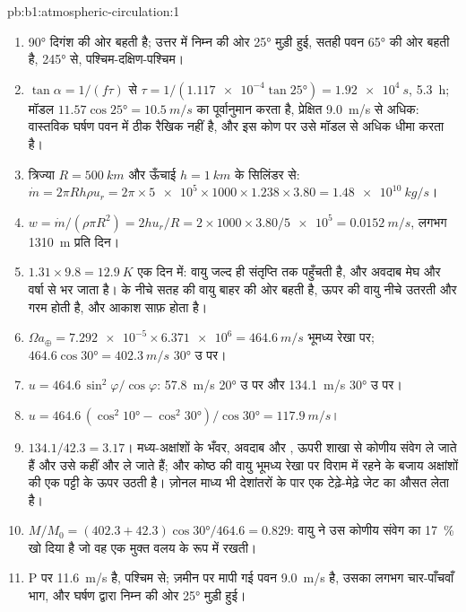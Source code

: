 \begin{solution}{pb:b1:atmospheric-circulation:1}
\begin{enumerate}
  \item {} \ang{90} दिगंश की ओर बहती है; उत्तर में निम्न की ओर \ang{25} मुड़ी हुई, सतही पवन \ang{65} की ओर बहती है, \ang{245} से, पश्चिम-दक्षिण-पश्चिम।
  \item $\tan\alpha = 1/(f\tau)$ से $\tau = 1/(\num{1.117e-4}\tan\ang{25}) =
        \qty{1.92e4}{s}$, \qty{5.3}{h}; मॉडल $11.57\cos\ang{25} =
        \qty{10.5}{m/s}$ का पूर्वानुमान करता है, प्रेक्षित \qty{9.0}{m/s} से अधिक: वास्तविक घर्षण पवन में ठीक रैखिक नहीं है, और इस कोण पर उसे मॉडल से अधिक धीमा करता है।
  \item त्रिज्या $R = \qty{500}{km}$ और ऊँचाई $h =
        \qty{1}{km}$ के सिलिंडर से: $\dot m = 2\pi R h\rho u_r = 2\pi \times \num{5e5} \times 1000
        \times 1.238 \times 3.80 = \qty{1.48e10}{kg/s}$।
  \item $w = \dot m/(\rho\pi R^2) = 2hu_r/R = 2 \times 1000 \times 3.80/\num{5e5} =
        \qty{0.0152}{m/s}$, लगभग \qty{1310}{m} प्रति दिन।
  \item $1.31 \times 9.8 = \qty{12.9}{K}$ एक दिन में: वायु जल्द ही संतृप्ति तक पहुँचती है, और अवदाब मेघ और वर्षा से भर जाता है।  के नीचे सतह की वायु बाहर की ओर बहती है, ऊपर की वायु नीचे उतरती और गरम होती है, और आकाश साफ़ होता है।
  \item $\Omega a_\oplus = \num{7.292e-5} \times \num{6.371e6} = \qty{464.6}{m/s}$
        भूमध्य रेखा पर; $464.6\cos\ang{30} = \qty{402.3}{m/s}$ \ang{30} उ पर।
  \item $u = 464.6\,\sin^2\varphi/\cos\varphi$: \qty{57.8}{m/s} \ang{20} उ पर और
        \qty{134.1}{m/s} \ang{30} उ पर।
  \item $u = 464.6\,(\cos^2\ang{10} - \cos^2\ang{30})/\cos\ang{30} =
        \qty{117.9}{m/s}$।
  \item $134.1/42.3 = 3.17$। मध्य-अक्षांशों के भँवर, अवदाब और , ऊपरी शाखा से कोणीय संवेग ले जाते हैं और उसे कहीं और ले जाते हैं; और कोष्ठ की वायु भूमध्य रेखा पर विराम में रहने के बजाय अक्षांशों की एक पट्टी के ऊपर उठती है। ज़ोनल माध्य भी देशांतरों के पार एक टेढ़े-मेढ़े जेट का औसत लेता है।
  \item $M/M_0 = (402.3 + 42.3)\cos\ang{30}/464.6 = 0.829$: वायु ने उस कोणीय संवेग का \qty{17}{\percent} खो दिया है जो वह एक मुक्त वलय के रूप में रखती।
  \item P पर  \qty{11.6}{m/s} है, पश्चिम से; ज़मीन पर मापी गई पवन \qty{9.0}{m/s} है, उसका लगभग चार-पाँचवाँ भाग, और घर्षण द्वारा निम्न की ओर \ang{25} मुड़ी हुई।
\end{enumerate}
\end{solution}
